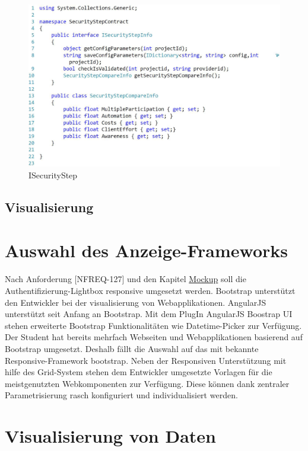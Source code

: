 \begin{figure}[htbp]
\centering
\includegraphics{images/code/ISecurityStep.png}
\caption{ISecurityStep}
\end{figure}

\subsection{Visualisierung}\label{visualisierung}

\section{Auswahl des
Anzeige-Frameworks}\label{auswahl-des-anzeige-frameworks}

Nach Anforderung {[}NFREQ-127{]} und den Kapitel
\protect\hyperlink{mockup}{Mockup} soll die Authentifizierung-Lightbox
responsive umgesetzt werden. Bootstrap unterstützt den Entwickler bei
der visualisierung von Webapplikationen. AngularJS unterstützt seit
Anfang an Bootstrap. Mit dem PlugIn AngularJS Boostrap UI stehen
erweiterte Bootstrap Funktionalitäten wie Datetime-Picker zur Verfügung.
Der Student hat bereits mehrfach Webseiten und Webapplikationen
basierend auf Bootstrap umgesetzt. Deshalb fällt die Auswahl auf das mit
bekannte Responsive-Framework bootstrap. Neben der Responsiven
Unterstützung mit hilfe des Grid-System stehen dem Entwickler umgesetzte
Vorlagen für die meistgenutzten Webkomponenten zur Verfügung. Diese
können dank zentraler Parametrisierung rasch konfiguriert und
individualisiert werden.

\section{Visualisierung von Daten}\label{visualisierung-von-daten}

